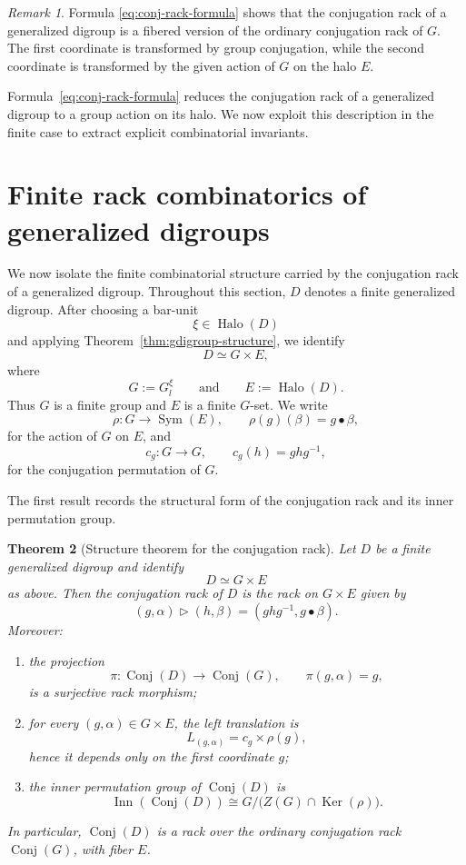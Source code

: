 \documentclass[11pt]{article}
\theoremstyle{plain}
\newtheorem{theorem}{Theorem}[section]
\theoremstyle{definition}
\theoremstyle{remark}
\newtheorem{remark}[theorem]{Remark}
\DeclareMathOperator{\Conj}{Conj}
\DeclareMathOperator{\Halo}{Halo}
\begin{document}
	\begin{remark}\label{rem:conj-rack-base-fiber}
		Formula \eqref{eq:conj-rack-formula} shows that the conjugation rack of a
		generalized digroup is a fibered version of the ordinary conjugation rack
		of \(G\). The first coordinate is transformed by group conjugation, while
		the second coordinate is transformed by the given action of \(G\) on the
		halo \(E\).
	\end{remark}
	
	Formula~\eqref{eq:conj-rack-formula} reduces the conjugation rack of a
	generalized digroup to a group action on its halo. We now exploit this
	description in the finite case to extract explicit combinatorial invariants.
	
	\section{Finite rack combinatorics of generalized digroups}
	
	We now isolate the finite combinatorial structure carried by the conjugation
	rack of a generalized digroup. Throughout this section, \(D\) denotes a
	finite generalized digroup. After choosing a bar-unit
	\[
	\xi\in\Halo(D)
	\]
	and applying Theorem~\ref{thm:gdigroup-structure}, we identify
	\[
	D\simeq G\times E,
	\]
	where
	\[
	G:=G_l^\xi
	\qquad\text{and}\qquad
	E:=\Halo(D).
	\]
	Thus \(G\) is a finite group and \(E\) is a finite \(G\)-set. We write
	\[
	\rho:G\longrightarrow \operatorname{Sym}(E),
	\qquad
	\rho(g)(\beta)=g\bullet\beta,
	\]
	for the action of \(G\) on \(E\), and
	\[
	c_g:G\longrightarrow G,
	\qquad
	c_g(h)=ghg^{-1},
	\]
	for the conjugation permutation of \(G\).
	
	The first result records the structural form of the conjugation rack and its
	inner permutation group.
	
	\begin{theorem}[Structure theorem for the conjugation rack]\label{thm:conj-structure}
		Let \(D\) be a finite generalized digroup and identify
		\[
		D\simeq G\times E
		\]
		as above. Then the conjugation rack of \(D\) is the rack on \(G\times E\)
		given by
		\[
		(g,\alpha)\triangleright(h,\beta)
		=
		(ghg^{-1},g\bullet\beta).
		\]
		Moreover:
		\begin{enumerate}
			\item the projection
			\[
			\pi:\Conj(D)\longrightarrow\Conj(G),
			\qquad
			\pi(g,\alpha)=g,
			\]
			is a surjective rack morphism;
			
			\item for every \((g,\alpha)\in G\times E\), the left translation is
			\[
			L_{(g,\alpha)}=c_g\times \rho(g),
			\]
			hence it depends only on the first coordinate \(g\);
			
			\item the inner permutation group of \(\Conj(D)\) is
			\[
			\operatorname{Inn}(\Conj(D))
			\cong
			G/\bigl(Z(G)\cap \operatorname{Ker}(\rho)\bigr).
			\]
		\end{enumerate}
		In particular, \(\Conj(D)\) is a rack over the ordinary conjugation rack
		\(\Conj(G)\), with fiber \(E\).
	\end{theorem}
	
\end{document}
